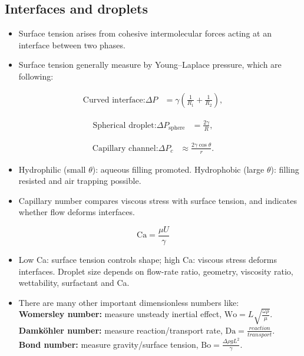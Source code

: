 \documentclass[10pt,a4paper]{ctexart}
\newcommand{\key}[1]{\textbf{#1}}
\newcommand{\formula}[1]{%
	\par\vspace{1pt}\begingroup
	\setlength{\abovedisplayskip}{0pt}\setlength{\belowdisplayskip}{0pt}
	\[ #1 \]\endgroup\vspace{1pt}}
\begin{document}
\begin{multicols*}{2}
\subsection{Interfaces and droplets}
\begin{itemize}
	\item Surface tension arises from cohesive intermolecular forces acting at an interface between two phases.
	\item Surface tension generally measure by Young–Laplace pressure, which are following:\\
\end{itemize}
\formula{\begin{aligned}
\text{Curved interface:} \Delta P&=\gamma\left(\frac1{R_1}+\frac1{R_2}\right),
\end{aligned}}
\formula{\begin{aligned}
\text{Spherical droplet:} \Delta P_{\mathrm{sphere}}&=\frac{2\gamma}{R},
\end{aligned}}
\formula{\begin{aligned}
\text{Capillary channel:} \Delta P_c&\approx\frac{2\gamma\cos\theta}{r}.
\end{aligned}}
\begin{itemize}
	\item Hydrophilic (small \(\theta\)): aqueous filling promoted. 
	Hydrophobic (large \(\theta\)): filling resisted and air trapping possible.
	\item Capillary number compares viscous stress with surface tension, and indicates whether flow deforms interfaces.
\end{itemize}
\formula{\mathrm{Ca}=\frac{\mu U}{\gamma}}
\begin{itemize}
	\item Low Ca: surface tension controls shape; high Ca: viscous stress deforms interfaces. 
	Droplet size depends on flow-rate ratio, geometry, viscosity ratio, wettability, surfactant and Ca.
	\item There are many other important dimensionless numbers like:\\
	\key{Womersley number:} measure unsteady inertial effect, \(\mathrm{Wo}=L\sqrt{\frac{\omega\rho}{\mu}}\).\\
	\key{Damköhler number:} measure reaction/transport rate, \(\mathrm{Da}=\frac{reaction}{transport}\).\\
	\key{Bond number:} measure gravity/surface tension, \(\mathrm{Bo}=\frac{\Delta\rho g L^2}{\gamma}\).\\
\end{itemize}



\end{multicols*}
\end{document}
